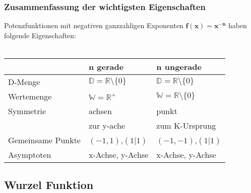 \begin{multicols}{3}
    \subsubsection*{Zusammenfassung der wichtigsten Eigenschaften}
    Potenzfunktionen mit negativen ganzzahligen Exponenten $\boldsymbol{f(x) = x^{-n}}$ haben folgende Eigenschaften: \\\\
    \begin{tabularx}{\columnwidth} {
            | >{\raggedright\arraybackslash}X
            | >{\raggedright\arraybackslash}X
            | >{\raggedright\arraybackslash}X |}
        \hline
                          & \textbf{n gerade}                       & \textbf{n ungerade}                     \\ \hline
        D-Menge  & $\mathbb{D} = \mathbb{R}\setminus\{0\}$ & $\mathbb{D} = \mathbb{R}\setminus\{0\}$ \\ \hline
        Wertemenge        & $\mathbb{W} = \mathbb{R}^{+}$           & $\mathbb{W} = \mathbb{R}\setminus\{0\}$ \\ \hline
        Symmetrie         & achsen                       & punkt                         \\
                          & zur y-ache                              & zum K-Ursprung                          \\ \hline
        Gemeinsame Punkte & $(-1,1)$,$(1|1)$                        & $(-1,-1)$,$(1|1)$                       \\ \hline
        Asymptoten        & x-Achse, y-Achse                        & x-Achse, y-Achse                        \\ \hline
    \end{tabularx}


    
    \subsection*{Wurzel Funktion}
    \begin{center}
\end{center}
\end{multicols}
